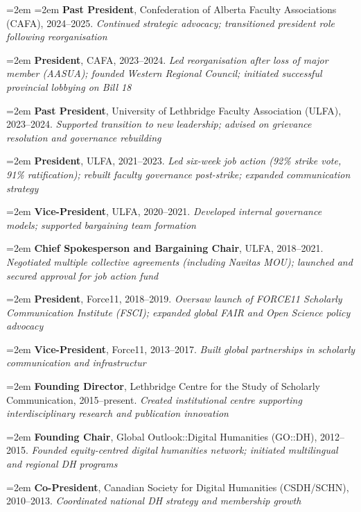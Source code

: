 \documentclass[12pt]{article}
\begin{document}
{\leftskip=2em
\hangindent=2em
\noindent
\textbf{Past President}, Confederation of Alberta Faculty Associations (CAFA), 2024–2025. \textit{Continued strategic advocacy; transitioned president role following reorganisation}


\hangindent=2em
\noindent
\textbf{President}, CAFA, 2023–2024. \textit{Led reorganisation after loss of major member (AASUA); founded Western Regional Council; initiated successful provincial lobbying on Bill 18}


\hangindent=2em
\noindent
\textbf{Past President}, University of Lethbridge Faculty Association (ULFA), 2023–2024. \textit{Supported transition to new leadership; advised on grievance resolution and governance rebuilding}


\hangindent=2em
\noindent
\textbf{President}, ULFA, 2021–2023. \textit{Led six-week job action (92\% strike vote, 91\% ratification); rebuilt faculty governance post-strike; expanded communication strategy}


\hangindent=2em
\noindent
\textbf{Vice-President}, ULFA, 2020–2021. \textit{Developed internal governance models; supported bargaining team formation}

\hangindent=2em
\noindent
\textbf{Chief Spokesperson and Bargaining Chair}, ULFA, 2018–2021. \textit{Negotiated multiple collective agreements (including Navitas MOU); launched and secured approval for job action fund}


\hangindent=2em
\noindent
\textbf{President}, Force11, 2018–2019. \textit{Oversaw launch of FORCE11 Scholarly Communication Institute (FSCI); expanded global FAIR and Open Science policy advocacy}


\hangindent=2em
\noindent
\textbf{Vice-President}, Force11, 2013–2017. \textit{Built global partnerships in scholarly communication and infrastructur}

\hangindent=2em
\noindent
\textbf{Founding Director}, Lethbridge Centre for the Study of Scholarly Communication, 2015–present. \textit{Created institutional centre supporting interdisciplinary research and publication innovation}


\hangindent=2em
\noindent
\textbf{Founding Chair}, Global Outlook::Digital Humanities (GO::DH), 2012–2015. \textit{Founded equity-centred digital humanities network; initiated multilingual and regional DH programs}


\hangindent=2em
\noindent
\textbf{Co-President}, Canadian Society for Digital Humanities (CSDH/SCHN), 2010–2013. \textit{Coordinated national DH strategy and membership growth}


}
\end{document}
